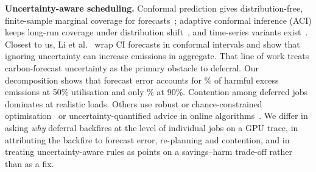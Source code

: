 \textbf{Uncertainty-aware scheduling.}
Conformal prediction gives distribution-free, finite-sample marginal coverage for
forecasts~\cite{angelopoulos2023gentle}; adaptive conformal inference (ACI) keeps long-run coverage
under distribution shift~\cite{gibbs2021aci}, and time-series variants exist~\cite{xu2023spci,xu2023cpts}.
Closest to us, Li et al.~\cite{li2024uncertainty} wrap CI forecasts in conformal intervals and show
that ignoring uncertainty can increase emissions in aggregate. That line of work treats
carbon-forecast uncertainty as the primary obstacle to deferral. Our decomposition shows that forecast
error accounts for \% of harmful excess emissions
at 50\% utilisation and only \% at 90\%. Contention
among deferred jobs dominates at realistic loads. Others use robust or
chance-constrained optimisation~\cite{hall2025probabilistic,yang2025conformalccp,ruparel2026dro} or
uncertainty-quantified advice in online algorithms~\cite{johnson2025uqadvice}.
We differ in asking \emph{why} deferral backfires at the level of individual jobs on a GPU trace,
in attributing the backfire to forecast error, re-planning and contention, and in treating
uncertainty-aware rules as points on a savings--harm trade-off rather than as a fix.
